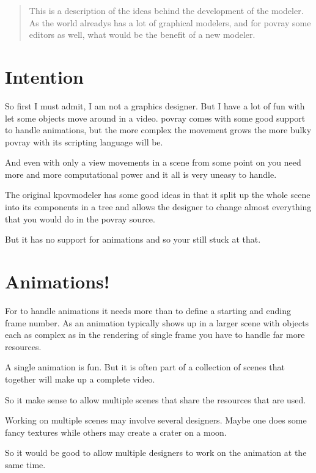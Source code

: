 \documentclass[english]{article}
\title{}
\author{Hans-Jürgen Lange $<$hjl@simulated-universe.de$>$}
\begin{document}
\maketitle

\begin{abstract}
	This is a description of the ideas behind the development of the modeler. As the world alreadys has a lot of graphical modelers, and for povray some editors as well, what would be the benefit of a new modeler.

\end{abstract}

\section{Intention}
So first I must admit, I am not a graphics designer. But I have a lot of fun with let some objects move around in a video. povray comes with some good support to handle animations, but the more complex the movement grows the more bulky povray with its scripting language will be.

And even with only a view movements in a scene from some point on you need more and more computational power and it all is very uneasy to handle.

The original kpovmodeler has some good ideas in that it split up the whole scene into its components in a tree and allows the designer to change almost everything that you would do in the povray source.

But it has no support for animations and so your still stuck at that.

\section{Animations!}
For to handle animations it needs more than to define a starting and ending frame number. As an animation typically shows up in a larger scene with objects each as complex as in the rendering of single frame you have to handle far more resources.

A single animation is fun. But it is often part of a collection of scenes that together will make up a complete video. 

So it make sense to allow multiple scenes that share the resources that are used. 

Working on multiple scenes may involve several designers. Maybe one does some fancy textures while others may create a crater on a moon.

So it would be good to allow multiple designers to work on the animation at the same time.
\end{document}

